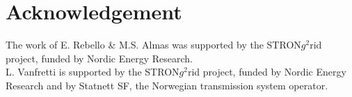 \documentclass[a4paper, 10 pt, conference]{IEEEtran}
\begin{document}


\section*{Acknowledgement}
The work of E. Rebello \& M.S. Almas was supported by the STRON$g^{2}$rid project, funded by Nordic Energy Research.\\
L. Vanfretti is supported by the STRON$g^{2}$rid project, funded by Nordic Energy Research and by Statnett SF, the Norwegian transmission system operator.

%
%
%
\end{document}
